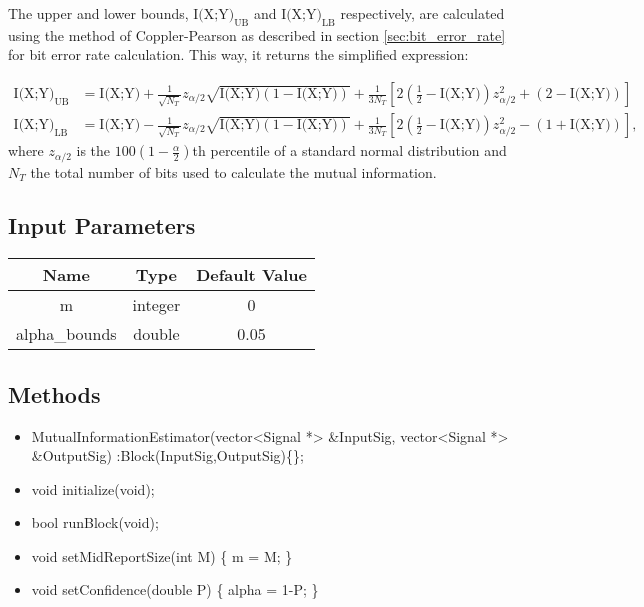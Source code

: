 \begin{refsection}
The upper and lower bounds, $\text{I(X;Y)}_\text{UB}$ and $\text{I(X;Y)}_\text{LB}$ respectively, are calculated using the method of Coppler-Pearson as described in section \ref{sec:bit_error_rate} for bit error rate calculation. This way, it returns the simplified expression:

\begin{align}
\text{I(X;Y)}_\text{UB}&=\text{I(X;Y)}+\frac{1}{\sqrt{N_T}}z_{\alpha/2}\sqrt{\text{I(X;Y)}(1-\text{I(X;Y)})}+\frac{1}{3N_T}\left[2\left(\frac{1}{2}-\text{I(X;Y)}\right)z_{\alpha/2}^2+(2-\text{I(X;Y)})\right]\\
\text{I(X;Y)}_\text{LB}&=\text{I(X;Y)}-\frac{1}{\sqrt{N_T}}z_{\alpha/2}\sqrt{\text{I(X;Y)}(1-\text{I(X;Y)})}+\frac{1}{3N_T}\left[2\left(\frac{1}{2}-\text{I(X;Y)}\right)z_{\alpha/2}^2-(1+\text{I(X;Y)})\right],
\end{align}
where $z_{\alpha/2}$ is the $100\left(1-\frac{\alpha}{2}\right)$th percentile of a standard normal distribution and $N_T$ the total number of bits used to calculate the mutual information. 


\subsection*{Input Parameters}

\begin{table}[H]
\centering
\begin{tabular}{|c|c|c|}
\hline
Name           & Type           & Default Value     \\ \hline
m              & integer        & 0                 \\ \hline
alpha\_bounds  & double         & 0.05              \\ \hline
\end{tabular}
\end{table}

\subsection*{Methods}

\begin{itemize}
  \item MutualInformationEstimator(vector<Signal *> \&InputSig, vector<Signal *> \&OutputSig) :Block(InputSig,OutputSig)\{\};
  \item void initialize(void);
  \item bool runBlock(void);
  \item void setMidReportSize(int M) \{ m = M; \}
  \item void setConfidence(double P) \{ alpha = 1-P; \}
\end{itemize}


\end{refsection}
